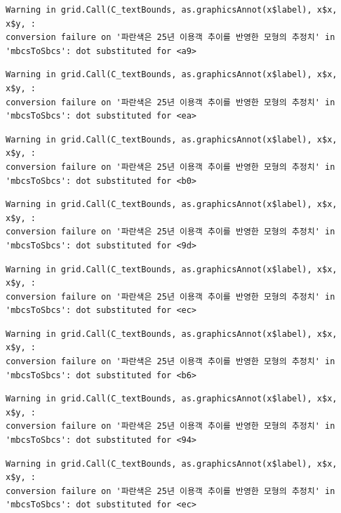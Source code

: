 \documentclass[
  letterpaper,
  DIV=11,
  numbers=noendperiod]{scrreprt}
\begin{document}
\begin{verbatim}
Warning in grid.Call(C_textBounds, as.graphicsAnnot(x$label), x$x, x$y, :
conversion failure on '파란색은 25년 이용객 추이를 반영한 모형의 추정치' in
'mbcsToSbcs': dot substituted for <a9>
\end{verbatim}

\begin{verbatim}
Warning in grid.Call(C_textBounds, as.graphicsAnnot(x$label), x$x, x$y, :
conversion failure on '파란색은 25년 이용객 추이를 반영한 모형의 추정치' in
'mbcsToSbcs': dot substituted for <ea>
\end{verbatim}

\begin{verbatim}
Warning in grid.Call(C_textBounds, as.graphicsAnnot(x$label), x$x, x$y, :
conversion failure on '파란색은 25년 이용객 추이를 반영한 모형의 추정치' in
'mbcsToSbcs': dot substituted for <b0>
\end{verbatim}

\begin{verbatim}
Warning in grid.Call(C_textBounds, as.graphicsAnnot(x$label), x$x, x$y, :
conversion failure on '파란색은 25년 이용객 추이를 반영한 모형의 추정치' in
'mbcsToSbcs': dot substituted for <9d>
\end{verbatim}

\begin{verbatim}
Warning in grid.Call(C_textBounds, as.graphicsAnnot(x$label), x$x, x$y, :
conversion failure on '파란색은 25년 이용객 추이를 반영한 모형의 추정치' in
'mbcsToSbcs': dot substituted for <ec>
\end{verbatim}

\begin{verbatim}
Warning in grid.Call(C_textBounds, as.graphicsAnnot(x$label), x$x, x$y, :
conversion failure on '파란색은 25년 이용객 추이를 반영한 모형의 추정치' in
'mbcsToSbcs': dot substituted for <b6>
\end{verbatim}

\begin{verbatim}
Warning in grid.Call(C_textBounds, as.graphicsAnnot(x$label), x$x, x$y, :
conversion failure on '파란색은 25년 이용객 추이를 반영한 모형의 추정치' in
'mbcsToSbcs': dot substituted for <94>
\end{verbatim}

\begin{verbatim}
Warning in grid.Call(C_textBounds, as.graphicsAnnot(x$label), x$x, x$y, :
conversion failure on '파란색은 25년 이용객 추이를 반영한 모형의 추정치' in
'mbcsToSbcs': dot substituted for <ec>
\end{verbatim}
\end{document}

